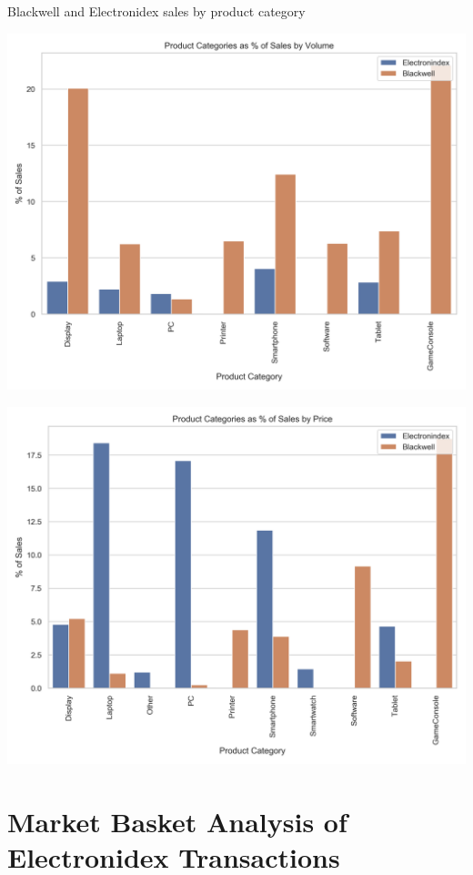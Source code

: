 \documentclass[12pt,a4paper,leqno]{report}
\theoremstyle{plain}
\theoremstyle{definition}
\theoremstyle{remark}
\begin{document}
Blackwell and Electronidex sales by product category

\bigskip
{
    \centering
    \includegraphics[width=\textwidth,height=\textheight,keepaspectratio]{sales_distribution_of_product_categories_by_volume_no_accessories.png}
    \par
}
\bigskip

\bigskip
{
    \centering
    \includegraphics[width=\textwidth,height=\textheight,keepaspectratio]{sales_distribution_of_product_categories_by_price_no_accessories.png}
    \par
}
\bigskip

\section{Market Basket Analysis of Electronidex Transactions}
\end{document}
